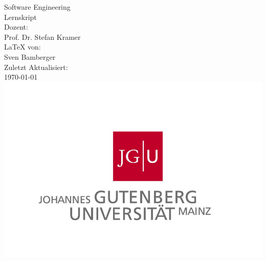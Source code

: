 \begin{titlepage}
\center
\Large Software Engineering\large \\[2em]
Lernskript \\[2em]
Dozent:\\Prof. Dr. Stefan Kramer\\[2em]
\LaTeX{} von:\\Sven Bamberger\\[2em]
Zuletzt Aktualisiert:\\\today\\
\includegraphics[scale=.2]{front/pics/Logo.jpg}\\\quad\\
\end{titlepage}
